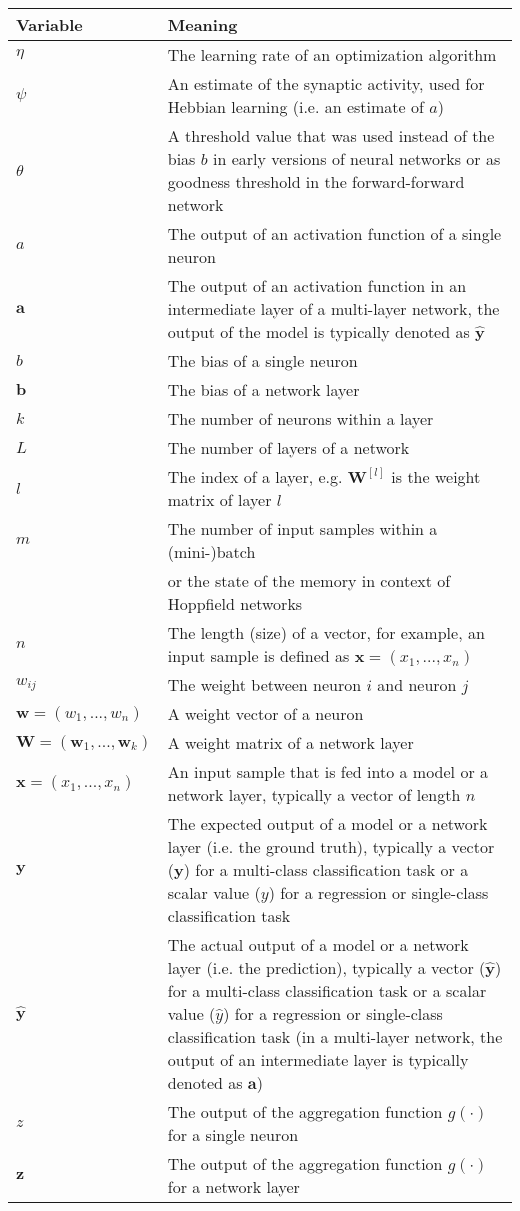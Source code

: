 \begin{tabular}{ p{3cm} p{11cm} }
	\textbf{Variable} & \textbf{Meaning}\\
	\hline
	$\eta$ & The learning rate of an optimization algorithm\\
	$\psi$ & An estimate of the synaptic activity, used for Hebbian learning (i.e. an estimate of $a$)\\
	$\theta$ & A threshold value that was used instead of the bias $b$ in early versions of neural networks or as goodness threshold in the forward-forward network\\
	$a$ & The output of an activation function of a single neuron\\
	$\boldsymbol{a}$ & The output of an activation function in an intermediate layer of a multi-layer network, the output of the model is typically denoted as $\boldsymbol{\hat{y}}$\\
	$b$ & The bias of a single neuron\\
	$\boldsymbol{b}$ & The bias of a network layer\\
	$k$ & The number of neurons within a layer\\
	$L$ & The number of layers of a network\\
	$l$ & The index of a layer, e.g. $\boldsymbol{W}^{[l]}$ is the weight matrix of layer $l$\\
	$m$ & The number of input samples within a (mini-)batch\\
	    & or the state of the memory in context of Hoppfield networks\\
	$n$ & The length (size) of a vector, for example, an input sample is defined as $\boldsymbol{x} = (x_1, ..., x_n)$\\
	$w_{ij}$ & The weight between neuron $i$ and neuron $j$\\
	$\boldsymbol{w} = (w_1, ..., w_n)$ & A weight vector of a neuron\\
	$\boldsymbol{W} = (\boldsymbol{w}_1, ..., \boldsymbol{w}_k)$ & A weight matrix of a network layer\\
	$\boldsymbol{x} = (x_1, ..., x_n)$ & An input sample that is fed into a model or a network layer, typically a vector of length $n$\\
	$\boldsymbol{y}$ & The expected output of a model or a network layer (i.e. the ground truth), typically a vector ($\boldsymbol{y}$) for a multi-class classification task or a scalar value ($y$) for a regression or single-class classification task\\
	$\boldsymbol{\hat{y}}$ & The actual output of a model or a network layer (i.e. the prediction), typically a vector ($\boldsymbol{\hat{y}}$) for a multi-class classification task or a scalar value ($\hat{y}$) for a regression or single-class classification task (in a multi-layer network, the output of an intermediate layer is typically denoted as $\boldsymbol{a}$)\\
	$z$ & The output of the aggregation function $g(\cdot)$ for a single neuron\\
	$\boldsymbol{z}$ & The output of the aggregation function $g(\cdot)$ for a network layer\\
\end{tabular}


